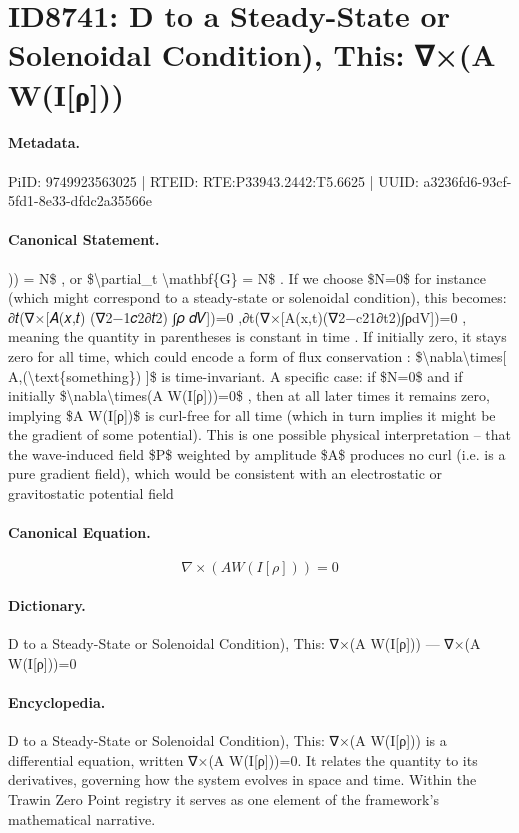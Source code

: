 \section*{ID8741: D to a Steady-State or Solenoidal Condition), This: ∇×(A W(I[ρ]))}
\paragraph{Metadata.}
PiID: 9749923563025 | RTEID: RTE:P33943.2442:T5.6625 | UUID: a3236fd6-93cf-5fd1-8e33-dfdc2a35566e

\paragraph{Canonical Statement.}
)) = N\$ , or \$\textbackslash{}partial\_t \textbackslash{}mathbf\{G\} = N\$ . If we choose \$N=0\$ for instance (which might correspond to a steady-state or solenoidal condition), this becomes: ∂𝑡(∇×[𝐴(𝑥,𝑡) (∇2−1𝑐2∂𝑡2) ⁣∫𝜌 𝑑𝑉])=0 ,∂t​(∇×[A(x,t)(∇2−c21​∂t2​)∫ρdV])=0 , meaning the quantity in parentheses is constant in time . If initially zero, it stays zero for all time, which could encode a form of flux conservation : \$\textbackslash{}nabla\textbackslash{}times[ A,(\textbackslash{}text\{something\}) ]\$ is time-invariant. A specific case: if \$N=0\$ and if initially \$\textbackslash{}nabla\textbackslash{}times(A W(I[ρ]))=0\$ , then at all later times it remains zero, implying \$A W(I[ρ])\$ is curl-free for all time (which in turn implies it might be the gradient of some potential). This is one possible physical interpretation – that the wave-induced field \$P\$ weighted by amplitude \$A\$ produces no curl (i.e. is a pure gradient field), which would be consistent with an electrostatic or gravitostatic potential field

\paragraph{Canonical Equation.}
\[
\nabla\times(A W(I[ρ]))=0
\]

\paragraph{Dictionary.}
D to a Steady-State or Solenoidal Condition), This: ∇×(A W(I[ρ])) — ∇×(A W(I[ρ]))=0

\paragraph{Encyclopedia.}
D to a Steady-State or Solenoidal Condition), This: ∇×(A W(I[ρ])) is a differential equation, written ∇×(A W(I[ρ]))=0. It relates the quantity to its derivatives, governing how the system evolves in space and time. Within the Trawin Zero Point registry it serves as one element of the framework's mathematical narrative.
